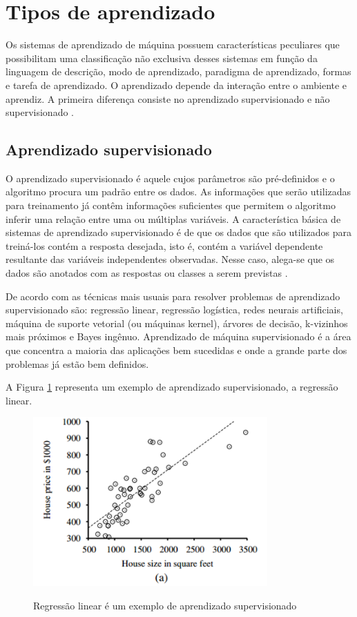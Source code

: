 \section{Tipos de aprendizado}

Os sistemas de aprendizado de máquina possuem características peculiares que possibilitam uma classificação não exclusiva desses sistemas em função da linguagem de descrição, modo de aprendizado, paradigma de aprendizado, formas e tarefa de aprendizado.
O aprendizado depende da interação entre o ambiente e aprendiz. A primeira diferença consiste no aprendizado supervisionado e não supervisionado \cite{uml}.

\subsection{Aprendizado supervisionado}

O aprendizado supervisionado é aquele cujos parâmetros são pré-definidos e o algoritmo procura um padrão entre os dados. As informações que serão utilizadas para treinamento já contêm informações suficientes que permitem o algoritmo inferir uma relação entre uma ou múltiplas variáveis. A característica básica de sistemas de aprendizado supervisionado é de que os dados que são utilizados para treiná-los contém a resposta desejada, isto é, contém a variável dependente resultante das variáveis independentes observadas. Nesse caso, alega-se que os dados são anotados com as respostas ou classes a serem previstas \cite{learning-algorithms}.

De acordo com  as técnicas mais usuais para resolver problemas de aprendizado supervisionado são: regressão linear, regressão logística, redes neurais artificiais, máquina de suporte vetorial (ou máquinas kernel), árvores de decisão, k-vizinhos mais próximos e Bayes ingênuo. Aprendizado de máquina supervisionado é a área que concentra a maioria das aplicações bem sucedidas e onde a grande parte dos problemas já estão bem definidos.

A Figura \ref{fig:reg-linear} representa um exemplo de aprendizado supervisionado, a regressão linear.

\begin{figure}[h]
    \caption{Regressão linear é um exemplo de aprendizado supervisionado}
    \centering
    \includegraphics[width=0.8\textwidth]{Textuais/Figuras/linear-ml.png}
    \label{fig:reg-linear}
\end{figure}

